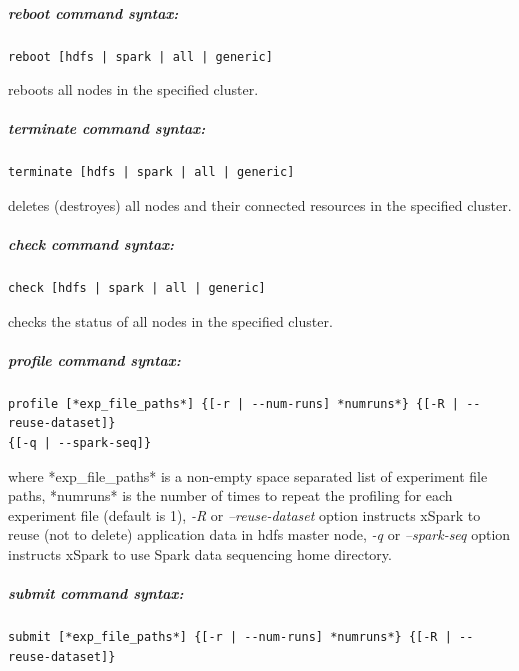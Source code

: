 \hypertarget{reboot-command-syntax}{%
\subparagraph{\texorpdfstring{\emph{reboot} command
		syntax:}{reboot command syntax:}}\label{reboot-command-syntax}}

\begin{verbatim}
reboot [hdfs | spark | all | generic]
\end{verbatim}

reboots all nodes in the specified cluster.

\hypertarget{terminate-command-syntax}{%
\subparagraph{\texorpdfstring{\emph{terminate} command
		syntax:}{terminate command syntax:}}\label{terminate-command-syntax}}

\begin{verbatim}
terminate [hdfs | spark | all | generic]
\end{verbatim}

deletes (destroyes) all nodes and their connected resources in the
specified cluster.

\hypertarget{check-command-syntax}{%
\subparagraph{\texorpdfstring{\emph{check} command
		syntax:}{check command syntax:}}\label{check-command-syntax}}

\begin{verbatim}
check [hdfs | spark | all | generic]
\end{verbatim}

checks the status of all nodes in the specified cluster.

\hypertarget{profile-command-syntax}{%
\subparagraph{\texorpdfstring{\emph{profile} command
		syntax:}{profile command syntax:}}\label{profile-command-syntax}}

\begin{verbatim}
profile [*exp_file_paths*] {[-r | --num-runs] *numruns*} {[-R | --reuse-dataset]} 
{[-q | --spark-seq]}      
\end{verbatim}

where *exp\_file\_paths* is a non-empty space separated list of
experiment file paths, *numruns* is the number of times to repeat the
profiling for each experiment file (default is 1), \emph{-R} or
\emph{--reuse-dataset} option instructs xSpark to reuse (not to delete)
application data in hdfs master node, \emph{-q} or \emph{--spark-seq}
option instructs xSpark to use Spark data sequencing home directory.

\hypertarget{submit-command-syntax}{%
\subparagraph{\texorpdfstring{\emph{submit} command
		syntax:}{submit command syntax:}}\label{submit-command-syntax}}

\begin{verbatim}
submit [*exp_file_paths*] {[-r | --num-runs] *numruns*} {[-R | --reuse-dataset]}       
\end{verbatim}

